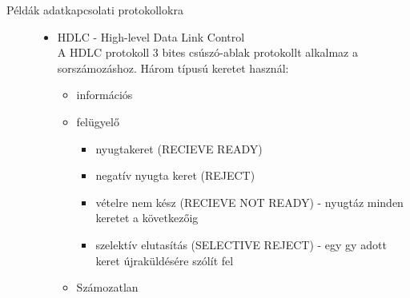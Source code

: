 \documentclass[margin=0px]{article}
\begin{document}
\begin{description}
\begin{description}
					\item[Példák adatkapcsolati protokollokra] \hfill
						\begin{itemize}
							\item HDLC - High-level Data Link Control \\
								A HDLC protokoll 3 bites csúszó-ablak protokollt alkalmaz  a sorszámozáshoz. 
								Három típusú keretet használ:
								\begin{itemize}
									\item információs
									\item felügyelő
									\begin{itemize}
										\item nyugtakeret (RECIEVE READY)
										\item negatív nyugta keret (REJECT)
										\item vételre nem kész (RECIEVE NOT READY) - nyugtáz minden keretet a következőig
										\item szelektív elutasítás (SELECTIVE REJECT) - egy gy adott keret újraküldésére szólít fel 
									\end{itemize}
									\item Számozatlan
								\end{itemize}
								

\end{itemize}
\end{description}
\end{description}
\end{document}
